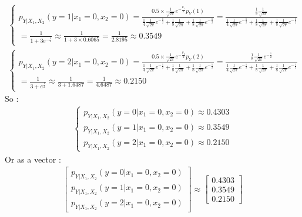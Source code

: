 \documentclass[12pt]{article}
\begin{document}
\begin{qsolve}
\begin{gather*}
        \begin{cases}
            p_{Y|X_1,X_2}(y = 1|x_1 = 0 ,x_2 = 0) = \frac{0.5 \times \frac{1}{\sqrt{2 \pi}} e^{-\frac{\mu_1}{2}} p_Y(1) }{\frac{1}{4} \frac{1}{\sqrt{2 \pi}} e^{-\frac{1}{2}} + \frac{1}{8}  \frac{1}{\sqrt{2 \pi}} + \frac{1}{8}  \frac{1}{\sqrt{2 \pi}} e^{-\frac{1}{2}}} = \frac{\frac{1}{8} \frac{1}{\sqrt{2 \pi}}}{\frac{1}{4} \frac{1}{\sqrt{2 \pi}} e^{-\frac{1}{2}} + \frac{1}{8}  \frac{1}{\sqrt{2 \pi}} + \frac{1}{8}  \frac{1}{\sqrt{2 \pi}} e^{-\frac{1}{2}}} \\
            = \frac{1}{1 + 3 e^{-\frac{1}{2}}} \approx  \frac{1}{1 + 3 \times 0.6065} = \frac{1}{2.8195} \approx 0.3549
        \end{cases}\\
        \begin{cases}
            p_{Y|X_1,X_2}(y = 2|x_1 = 0 ,x_2 = 0) = \frac{0.5 \times \frac{1}{\sqrt{2 \pi}} e^{-\frac{\mu_2}{2}} p_Y(2) }{\frac{1}{4} \frac{1}{\sqrt{2 \pi}} e^{-\frac{1}{2}} + \frac{1}{8}  \frac{1}{\sqrt{2 \pi}} + \frac{1}{8}  \frac{1}{\sqrt{2 \pi}} e^{-\frac{1}{2}}} = \frac{\frac{1}{8} \frac{1}{\sqrt{2 \pi}} e^{-\frac{1}{2}}}{\frac{1}{4} \frac{1}{\sqrt{2 \pi}} e^{-\frac{1}{2}} + \frac{1}{8}  \frac{1}{\sqrt{2 \pi}} + \frac{1}{8}  \frac{1}{\sqrt{2 \pi}} e^{-\frac{1}{2}}} \\
            = \frac{1}{3 + e^{\frac{1}{2}}} \approx \frac{1}{3 + 1.6487} = \frac{1}{4.6487} \approx 0.2150
        \end{cases}
    \end{gather*}
    So :
    \begin{gather*}
        \begin{cases}
            p_{Y|X_1,X_2}(y = 0|x_1 = 0 ,x_2 = 0) \approx 0.4303 \\
            p_{Y|X_1,X_2}(y = 1|x_1 = 0 ,x_2 = 0) \approx 0.3549 \\
            p_{Y|X_1,X_2}(y = 2|x_1 = 0 ,x_2 = 0) \approx 0.2150
        \end{cases}
    \end{gather*}
    Or as a vector :
    \begin{gather*}
        \begin{bmatrix}
            p_{Y|X_1,X_2}(y = 0|x_1 = 0 ,x_2 = 0) \\
            p_{Y|X_1,X_2}(y = 1|x_1 = 0 ,x_2 = 0) \\
            p_{Y|X_1,X_2}(y = 2|x_1 = 0 ,x_2 = 0)
        \end{bmatrix}
        \approx
        \begin{bmatrix}
            0.4303 \\
            0.3549 \\
            0.2150
        \end{bmatrix}
    \end{gather*}
\end{qsolve}
\end{document}
